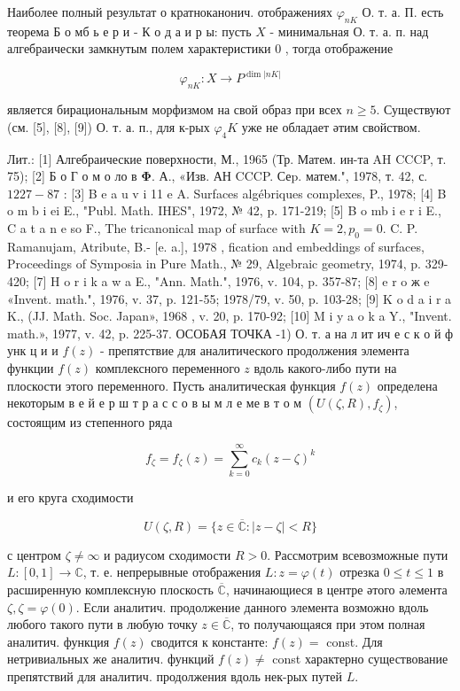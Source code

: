 \documentclass[10pt]{article}
\begin{document}
Наиболее полный результат о кратноканонич. отображениях $\varphi_{n K}$ О. т. а. П. есть теорема Б о мб ь е р и - К о д а и р ы: пусть $X$ - минимальная О. т. а. п. над алгебраически замкнутым полем характеристики 0 , тогда отображение

\[
\varphi_{n K}: X \longrightarrow P^{\operatorname{dim}|n K|}
\]

является бирациональным морфизмом на свой образ при всех $n \geqslant 5$. Существуют (см. [5], [8], [9]) О. т. а. п., для к-рых $\varphi_{4} K$ уже не обладает әтим свойством.

Лит.: [1] Алгебраические поверхности, М., 1965 (Тр. Матем. ин-та AH CCCP, т. 75); [2] Б о Г о м о ло в $\boldsymbol{\Phi}$. А., «Изв. АН CCCP. Сеp. матем.", 1978, т. 42, с. $1227-87$ : [3] B e a u v i 11 e A. Surfaces algébriques complexes, P., 1978; [4] B o m b i ei E., "Publ. Math. IHES", 1972, № 42, p. 171-219; [5] B o mb i e r i E., C a t a n e so F., The tricanonical map of surface with $K=2, p_{0}=0$. C. P. Ramanujam, Atribute, B.- [e. a.], 1978 , fication and embeddings of surfaces, Proceedings of Symposia in Pure Math., № 29, Algebraic geometry, 1974, p. 329-420; [7] H o r i k a w a E., "Ann. Math.", 1976, v. 104, p. 357-87; [8] e r o ж e «Invent. math.", 1976, v. 37, p. 121-55; 1978/79, v. 50, p. 103-28; [9] K o d a i r a K., (JJ. Math. Soc. Japan», 1968 , v. 20, p. 170-92; [10] M i y a o k a Y., "Invent. math.»,
1977, v. 42, p. 225-37. ОСОБАЯ ТОЧКА -1) О. т. а на л ит ич е с к о й ф унк ц и и $f(z)$ - препятствие для аналитического продолжения элемента функции $f(z)$ комплексного переменного $z$ вдоль какого-либо пути на плоскости этого переменного. Пусть аналитическая функция $f(z)$ определена некоторым в е й е р ш т р а с с о в ы м л е ме в т о м $\left(U(\zeta, R), f_{\zeta}\right)$, состоящим из степенного ряда

\[
f_{\zeta}=f_{\zeta}(z)=\sum_{k=0}^{\infty} c_{k}(z-\zeta)^{k}
\]

и его круга сходимости

\[
U(\zeta, R)=\{z \in \overline{\mathbb{C}}:|z-\zeta|<R\}
\]

с центром $\zeta \neq \infty$ и радиусом сходимости $R>0$. Рассмотрим всевозможные пути $L:[0,1] \rightarrow \mathbb{C}$, т. е. непрерывные отображения $L: z=\varphi(t)$ отрезка $0 \leqslant t \leqslant 1$ в расширенную комплексную плоскость $\overline{\mathbb{C}}$, начинающиеся в центре әтого әлемента $\zeta, \zeta=\varphi(0)$. Если аналитич. продолжение данного элемента возможно вдоль любого такого пути в любую точку $z \in \overline{\mathbb{C}}$, то получающаяся при этом полная аналитич. функция $f(z)$ сводится к константе: $f(z)=$ const. Для нетривиальных же аналитич. функций $f(z) \neq$ const характерно существование препятствий для аналитич. продолжения вдоль нек-рых путей $L$.
\end{document}
